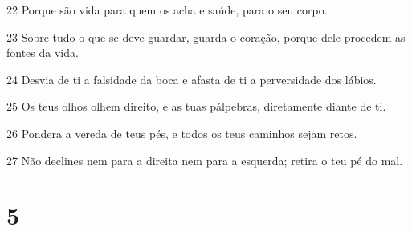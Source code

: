 \par 22 Porque são vida para quem os acha e saúde, para o seu corpo.
\par 23 Sobre tudo o que se deve guardar, guarda o coração, porque dele procedem as fontes da vida.
\par 24 Desvia de ti a falsidade da boca e afasta de ti a perversidade dos lábios.
\par 25 Os teus olhos olhem direito, e as tuas pálpebras, diretamente diante de ti.
\par 26 Pondera a vereda de teus pés, e todos os teus caminhos sejam retos.
\par 27 Não declines nem para a direita nem para a esquerda; retira o teu pé do mal.

\chapter{5}


